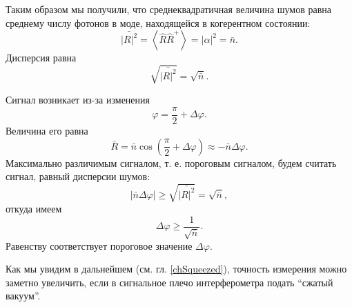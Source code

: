 Таким образом мы получили, что среднеквадратичная величина шумов равна
среднему числу фотонов в моде, находящейся в когерентном состоянии:
\begin{equation}
\bar{\left|R\right|^2} = 
\left<\hat{R}\hat{R}^{+}\right> = 
\left|\alpha\right|^2 =
\bar{n}.
\nonumber
\end{equation}
Дисперсия равна
\begin{equation}
\sqrt{\bar{\left|R\right|^2}} = 
\sqrt{\bar{n}}.
\nonumber
\end{equation}

Сигнал возникает из-за изменения 
\[
\varphi = \frac{\pi}{2} + \Delta \varphi.
\]
Величина его равна
\[
\bar{R} = \bar{n} \cos\left(\frac{\pi}{2} + \Delta \varphi\right) \approx
- \bar{n} \Delta \varphi.
\]
Максимально различимым сигналом, т. е. пороговым сигналом, будем
считать сигнал, равный дисперсии шумов:
\[
\left|\bar{n} \Delta \varphi\right| \ge
\sqrt{\bar{\left|R\right|^2}} = 
\sqrt{\bar{n}},
\]
откуда имеем
\[
\Delta \varphi  \ge \frac{1}{\sqrt{\bar{n}}}.
\]
Равенству соответствует пороговое значение $\Delta \varphi$.

Как мы увидим в дальнейшем (см. гл. \ref{chSqueezed}), точность измерения
можно заметно увеличить, если в сигнальное плечо интерферометра подать
``сжатый вакуум''.  


